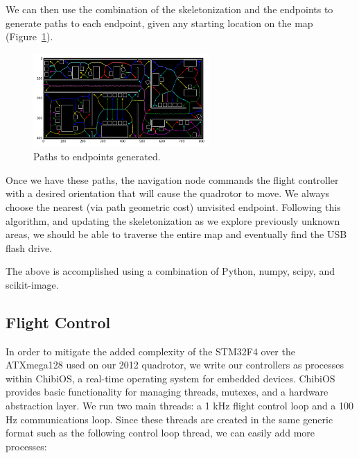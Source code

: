 \documentclass[12pt,letterpaper]{article} \usepackage[margin=1in]{geometry}
\begin{document}
We can then use the combination of the skeletonization and the endpoints to
generate paths to each endpoint, given any starting location on the map
(Figure~\ref{fig:generate_paths}).

\begin{figure}[!h]
	\centering
	\includegraphics[width=0.6\textwidth]{img/generate_paths.png}
	\caption{Paths to endpoints generated.}
	\label{fig:generate_paths}
\end{figure}

Once we have these paths, the navigation node commands the flight controller
with a desired orientation that will cause the quadrotor to move. We always
choose the nearest (via path geometric cost) unvisited endpoint. Following this
algorithm, and updating the skeletonization as we explore previously unknown
areas, we should be able to traverse the entire map and eventually find the USB
flash drive.

The above is accomplished using a combination of Python, numpy, scipy, and
scikit-image.


\subsection*{Flight Control}

In order to mitigate the added complexity of the STM32F4 over the ATXmega128
used on our 2012 quadrotor, we write our controllers as processes within
ChibiOS, a real-time operating system for embedded devices. ChibiOS provides
basic functionality for managing threads, mutexes, and a hardware abstraction
layer. We run two main threads: a 1 kHz flight control loop and a 100 Hz
communications loop. Since these threads are created in the same generic format
such as the following control loop thread, we can easily add more processes:
\end{document}
